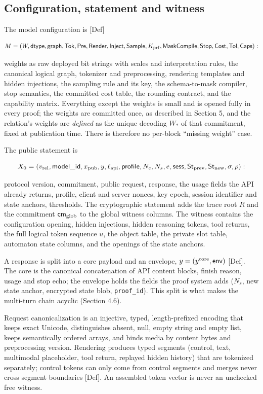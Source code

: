\documentclass[10pt]{article}
\begin{document}
\subsection{Configuration, statement and witness}
The model configuration is [Def]

\[M=(W,\mathsf{dtype},\mathsf{graph},\mathsf{Tok},\mathsf{Pre},\mathsf{Render},\mathsf{Inject},\mathsf{Sample},K_{\rm prf},\mathsf{MaskCompile},\mathsf{Stop},\mathsf{Cost},\mathsf{Tol},\mathsf{Caps}):\]

weights as raw deployed bit strings with scales and interpretation rules, the canonical logical graph, tokenizer and preprocessing, rendering templates and hidden injections, the sampling rule and its key, the schema-to-mask compiler, stop semantics, the committed cost table, the rounding contract, and the capability matrix. Everything except the weights is small and is opened fully in every proof; the weights are committed once, as described in Section 5, and the relation's weights are \emph{defined} as the unique decoding $W_*$ of that commitment, fixed at publication time. There is therefore no per-block ``missing weight'' case.

The public statement is

\[X_0=(v_{\rm rel},\mathsf{model\_id},x_{\rm pub},y,\ell_{\rm api},\mathsf{profile},N_c,N_s,e,\mathsf{sess},\mathsf{St}_{\rm prev},\mathsf{St}_{\rm new},\sigma,\rho):\]

protocol version, commitment, public request, response, the usage fields the API already returns, profile, client and server nonces, key epoch, session identifier and state anchors, thresholds. The cryptographic statement adds the trace root $R$ and the commitment $\mathsf{cm}_{\rm glob}$ to the global witness columns. The witness contains the configuration opening, hidden injections, hidden reasoning tokens, tool returns, the full logical token sequence $u$, the object table, the private slot table, automaton state columns, and the openings of the state anchors.

A response is split into a core payload and an envelope, $y=(y^{\rm core},\mathsf{env})$ [Def]. The core is the canonical concatenation of API content blocks, finish reason, usage and stop echo; the envelope holds the fields the proof system adds ($N_s$, new state anchor, encrypted state blob, \texttt{proof\_\allowbreak{}id}). This split is what makes the multi-turn chain acyclic (Section 4.6).

Request canonicalization is an injective, typed, length-prefixed encoding that keeps exact Unicode, distinguishes absent, null, empty string and empty list, keeps semantically ordered arrays, and binds media by content bytes and preprocessing version. Rendering produces typed segments (control, text, multimodal placeholder, tool return, replayed hidden history) that are tokenized separately; control tokens can only come from control segments and merges never cross segment boundaries [Def]. An assembled token vector is never an unchecked free witness.
\end{document}
